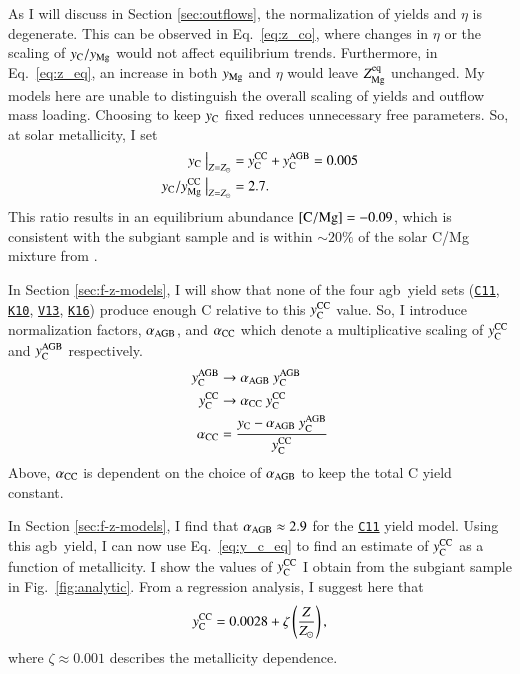 \documentclass[12pt,oneside,letterpaper]{report}
\newcommand{\agb}{\gls{agb}}
\newcommand{\cxi}{\texttt{\hyperlink{C11}{C11}}}
\newcommand{\kx}{\texttt{\hyperlink{K10}{K10}}}
\newcommand{\kxvi}{\texttt{\hyperlink{K16}{K16}}}
\newcommand{\vxiii}{\texttt{\hyperlink{V13}{V13}}}
\newcommand{\Ycc}{\ensuremath{y_{\rm C}^{\rm CC}}}
\newcommand{\Yoc}{\ensuremath{y_{\rm Mg}^{\rm CC}}}
\newcommand{\Ycagb}{\ensuremath{y_{\rm C}^{\rm AGB}}}
\newcommand{\Yct}{\ensuremath{y_{\rm C}}}
\newcommand{\about}[1]{${\sim} #1$}
\begin{document}
As I will discuss in Section \ref{sec:outflows}, the normalization of yields and $\eta$ is degenerate. This can be observed in Eq.~\ref{eq:z_co}, where changes in $\eta$ or the scaling of $y_{\rm C}/y_{\rm Mg}$ would not affect equilibrium trends. Furthermore, in Eq.~\ref{eq:z_eq}, an increase in both $y_{\rm Mg}$ and $\eta$ would leave $Z_{\rm Mg}^{\rm eq}$ unchanged. My models here are unable to distinguish the overall scaling of yields and outflow mass loading. Choosing to keep $y_{\rm C}$ fixed reduces unnecessary free parameters. So, at solar metallicity, I set
\begin{subequations}
    \begin{align}
        \Yct~\big\vert_{Z=Z_\odot} &= \Ycc + \Ycagb = 0.005 \\
        \Yct/\Yoc~\big\vert_{Z=Z_\odot} &= 2.7.
    \end{align}
\end{subequations}
This ratio results in an equilibrium abundance ${\rm [C/Mg]} = -0.09$, which is consistent with the \gls{subgiant} sample and is within \about{20\%} of the solar C/Mg mixture from \citet{asplund+09}.

In Section \ref{sec:f-z-models}, I will show that none of the four \agb\ yield sets (\cxi{}, \kx{}, \vxiii{}, \kxvi{}) produce enough C relative to this $\Ycc$ value. So, I introduce normalization factors, $\alpha_{\rm AGB}$, and $\alpha_{\rm CC}$ which denote a multiplicative scaling of $\Ycc$ and $\Ycagb$ respectively. 
\begin{subequations} \label{eq:alpha}
    \begin{align}
        \Ycagb &\rightarrow \alpha_{\rm AGB}\ \Ycagb \\
        \Ycc &\rightarrow \alpha_{\rm CC}\ \Ycc\\
        \alpha_{\rm CC} &= \frac{\Yct - \alpha_{\rm AGB}\ \Ycagb}{\Ycc}
    \end{align}
\end{subequations}
Above, $\alpha_{\rm CC}$ is dependent on the choice of $\alpha_{\rm AGB}$ to keep the total C yield constant. 

In Section \ref{sec:f-z-models}, I find that $\alpha_{\rm AGB}\approx 2.9$ for the \cxi{} yield model. Using this \agb\ yield, I can now use Eq.~\ref{eq:y_c_eq} to find an estimate of $\Ycc$ as a function of metallicity. I show the values of $\Ycc$ I obtain from the \gls{subgiant} sample in Fig.~\ref{fig:analytic}. From a regression analysis, I suggest here that
\begin{equation}\label{eq:zeta}
    \Ycc = 0.0028 + \zeta\left(\frac{Z}{Z_\odot}\right),
\end{equation}
where $\zeta\approx0.001$ describes the metallicity dependence.
\end{document}
